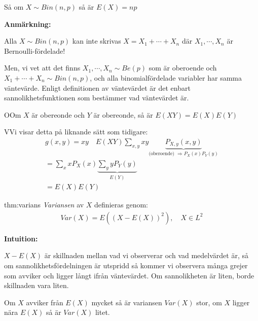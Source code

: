 \par\bigskip
\noindent Så om $X\sim Bin(n,p)$ så är $E(X)=np$
\par\bigskip
\noindent\textbf{Anmärkning:}\par
\noindent Alla $X\sim Bin(n,p)$ kan inte skrivas $X=X_1+\cdots+X_n$ där $X_1,\cdots,X_n$ är Bernoulli-fördelade!
\par\bigskip
\noindent Men, vi vet att det finns $X_1,\cdots, X_n\sim Be(p)$ som är oberoende och $X_1+\cdots+X_n\sim Bin(n,p)$, och alla binomialfördelade variabler har samma väntevärde. Enligt definitionen av väntevärdet är det enbart sannolikhetsfunktionen som bestämmer vad väntevärdet är.
\par\bigskip
\begin{theo}
  OOm $X$ är obereonde och $Y$ är obereonde, så är $E(XY) = E(X)E(Y)$
\end{theo}
\par\bigskip
\begin{prf}
  VVi visar detta på liknande sätt som tidigare:
  \begin{equation*}
    \begin{gathered}
      g(x,y) = xy\quad E(XY)\sum_{x,y}xy\underbrace{P_{X,y}(x,y)}_{\text{(oberoende) $\Rightarrow P_X(x)P_Y(y)$}}\\
      =\sum_xxP_X(x)\underbrace{\sum_yyP_Y(y)}_{\text{$E(Y)$}}\\
      = E(X)E(Y)
    \end{gathered}
  \end{equation*}
\end{prf}
\par\bigskip
\begin{theo}[Varians]{thm:varians}
  \textit{Variansen} av $X$ definieras genom:
  \begin{equation*}
    \begin{gathered}
      Var(X) = E((X-E(X))^2),\quad X\in L^2
    \end{gathered}
  \end{equation*}
\end{theo}
\par\bigskip
\noindent\textbf{Intuition:} \par
\noindent $X-E(X)$ är skillnaden mellan vad vi observerar och vad medelvärdet är, så om sannolikhetsfördelningen är utspridd så kommer vi observera många grejer som avviker och ligger långt ifrån väntevärdet. Om sannolikheten är liten, borde skillnaden vara liten.\par
\noindent Om $X$ avviker från $E(X)$ mycket så är variansen $Var(X)$ stor, om $X$ ligger nära $E(X)$ så är $Var(X)$ litet.
